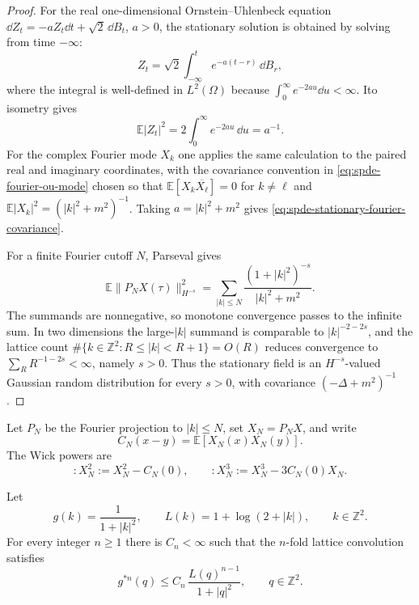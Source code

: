 \begin{proof}
For the real one-dimensional Ornstein--Uhlenbeck equation
\(\dd Z_t=-aZ_t\dd t+\sqrt2\,\dd B_t\), \(a>0\), the stationary solution is
obtained by solving from time \(-\infty\):
\[
  Z_t=\sqrt2\int_{-\infty}^{t}e^{-a(t-r)}\,\dd B_r,
\]
where the integral is well-defined in \(L^2(\Omega)\) because
\(\int_0^\infty e^{-2au}\dd u<\infty\).  Ito isometry gives
\[
  \mathbb E|Z_t|^2
  =
  2\int_0^\infty e^{-2au}\,\dd u
  =
  a^{-1}.
\]
For the complex Fourier mode \(X_k\) one applies the same calculation to the
paired real and imaginary coordinates, with the covariance convention in
\eqref{eq:spde-fourier-ou-mode} chosen so that
\(\mathbb E[X_k\overline{X_\ell}]=0\) for \(k\ne\ell\) and
\(\mathbb E|X_k|^2=(|k|^2+m^2)^{-1}\).  Taking
\(a=|k|^2+m^2\) gives \eqref{eq:spde-stationary-fourier-covariance}.

For a finite Fourier cutoff \(N\), Parseval gives
\[
  \mathbb E\|P_NX(\tau)\|_{H^{-s}}^2
  =
  \sum_{|k|\le N}
  \frac{(1+|k|^2)^{-s}}{|k|^2+m^2}.
\]
The summands are nonnegative, so monotone convergence passes to the infinite
sum.  In two dimensions the large-\(|k|\) summand is comparable to
\(|k|^{-2-2s}\), and the lattice count
\(\#\{k\in\mathbb Z^2: R\le |k|<R+1\}=O(R)\) reduces convergence to
\(\sum_R R^{-1-2s}<\infty\), namely \(s>0\).  Thus the stationary field is an
\(H^{-s}\)-valued Gaussian random distribution for every \(s>0\), with
covariance \((-\Delta+m^2)^{-1}\).
\end{proof}

Let \(P_N\) be the Fourier projection to \(|k|\leq N\), set \(X_N=P_NX\),
and write
\[
  C_N(x-y)=\mathbb E[X_N(x)X_N(y)].
\]
The Wick powers are
\[
  :\!X_N^2\!:=X_N^2-C_N(0),\qquad
  :\!X_N^3\!:=X_N^3-3C_N(0)X_N .
\]

\begin{lemma}
\label{lem:spde-massive-convolution-bound}
Let
\[
  g(k)=\frac{1}{1+|k|^2},\qquad
  L(k)=1+\log(2+|k|),
  \qquad k\in\mathbb Z^2 .
\]
For every integer \(n\geq1\) there is \(C_n<\infty\) such that the
\(n\)-fold lattice convolution satisfies
\begin{equation}
  g^{*n}(q)
  \leq
  C_n\,\frac{L(q)^{n-1}}{1+|q|^2},
  \qquad q\in\mathbb Z^2 .
  \label{eq:spde-lattice-convolution-bound}
\end{equation}
\end{lemma}

